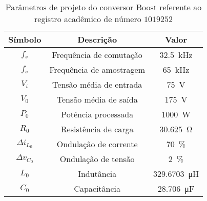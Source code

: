 \begin{table}[!ht]
\centering
\caption{Parâmetros de projeto do conversor Boost referente ao registro acadêmico de número $1019252$}
\label{tab:parametros}
\begin{tabular}{@{}ccc@{}}
\toprule
\textbf{Símbolo} & \textbf{Descrição} & \textbf{Valor}\\ \midrule
$f_s$ & Frequência de comutação & \SI{32.5}{\kilo\hertz}\\
$f_s$ & Frequência de amostragem & \SI{65}{\kilo\hertz}\\
$V_i$ & Tensão média de entrada  & \SI{75}{\V}\\
$V_0$ & Tensão média de saída  & \SI{175}{\V} \\
$P_0$ & Potência processada  & \SI{1000}{\W} \\
$R_0$ & Resistência de carga & \SI{30.625}{\ohm} \\
$\Delta{i_{L_0}}$  & Ondulação de corrente & \SI{70}{\%}\\
$\Delta{v_{C_0}}$  & Ondulação de tensão & \SI{2}{\%}\\
$L_0$ & Indutância & \SI{329.6703}{\micro\henry}\\
$C_0$ & Capacitância & \SI{28.706}{\micro\farad}\\
\bottomrule
\end{tabular}
\end{table}

